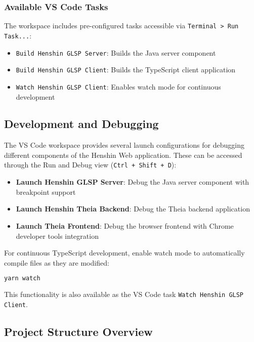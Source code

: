 \subsubsection{Available VS Code Tasks}

The workspace includes pre-configured tasks accessible via \texttt{Terminal > Run Task...}:

\begin{itemize}
    \item \texttt{Build Henshin GLSP Server}: Builds the Java server component
    \item \texttt{Build Henshin GLSP Client}: Builds the TypeScript client application
    \item \texttt{Watch Henshin GLSP Client}: Enables watch mode for continuous development
\end{itemize}

\subsection{Development and Debugging}
\label{subsec:debugging}

The VS Code workspace provides several launch configurations for debugging different components of the Henshin Web application. These can be accessed through the Run and Debug view (\texttt{Ctrl + Shift + D}):

\begin{itemize}
    \item \textbf{Launch Henshin GLSP Server}: Debug the Java server component with breakpoint support
    \item \textbf{Launch Henshin Theia Backend}: Debug the Theia backend application
    \item \textbf{Launch Theia Frontend}: Debug the browser frontend with Chrome developer tools integration
\end{itemize}

For continuous TypeScript development, enable watch mode to automatically compile files as they are modified:

\begin{lstlisting}[language=bash]
yarn watch
\end{lstlisting}

This functionality is also available as the VS Code task \texttt{Watch Henshin GLSP Client}.

\subsection{Project Structure Overview}
\label{subsec:project_structure}

